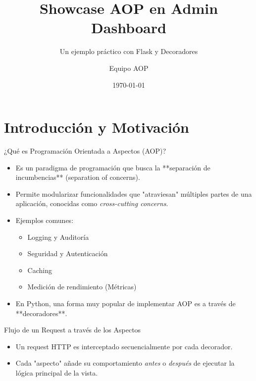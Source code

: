 \documentclass[spanish]{beamer}
\title{Showcase AOP en Admin Dashboard}
\subtitle{Un ejemplo práctico con Flask y Decoradores}
\author{Equipo AOP}
\date{\today}
\institute{Proyecto de Tópicos de Ingeniería de Software III}
\begin{document}
\begin{frame}
    \titlepage
\end{frame}

\section{Introducción y Motivación}

\begin{frame}{¿Qué es Programación Orientada a Aspectos (AOP)?}
    \begin{itemize}
        \item<1-> Es un paradigma de programación que busca la **separación de incumbencias** (separation of concerns).
        \item<2-> Permite modularizar funcionalidades que "atraviesan" múltiples partes de una aplicación, conocidas como \textit{cross-cutting concerns}.
        \item<3-> Ejemplos comunes:
        \begin{itemize}
            \item Logging y Auditoría
            \item Seguridad y Autenticación
            \item Caching
            \item Medición de rendimiento (Métricas)
        \end{itemize}
        \item<4-> En Python, una forma muy popular de implementar AOP es a través de **decoradores**.
    \end{itemize}
\end{frame}

\begin{frame}{Flujo de un Request a través de los Aspectos}
    \centering
    \vfill
    \begin{itemize}
        \item Un request HTTP es interceptado secuencialmente por cada decorador.
        \item Cada "aspecto" añade su comportamiento \textit{antes} o \textit{después} de ejecutar la lógica principal de la vista.
    \end{itemize}
\end{frame}
\end{document}
